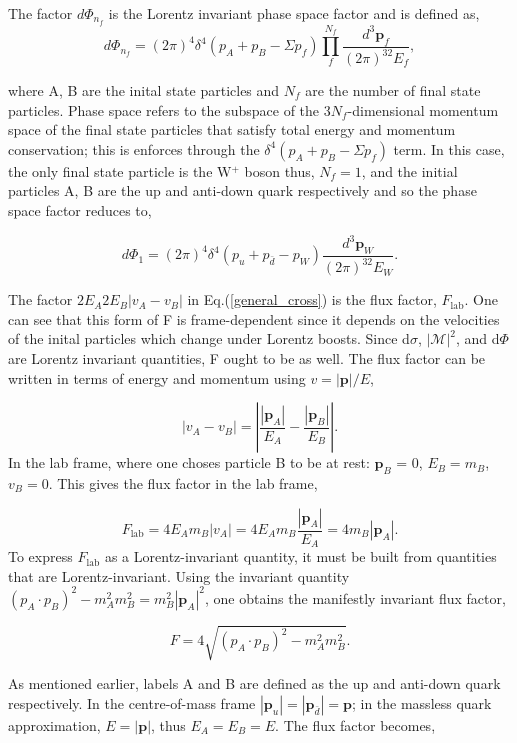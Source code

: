 \documentclass[a4paper,11pt]{article}
\begin{document}
The factor $d\Phi_{n_f}$ is the Lorentz invariant phase space factor and is defined as,
$$d\Phi_{n_f} = (2\pi)^4 \delta^4(p_A +p_B - \Sigma p_f) \prod_{f}^{N_f}\frac{d^3\boldsymbol{p}_f}{(2\pi)^32E_f},$$

where A, B are the inital state particles and $N_f$ are the number of final state particles. Phase space refers to the subspace of the $3N_f$-dimensional momentum space of the final state particles that satisfy total energy and momentum conservation; this is enforces through the $\delta^4(p_A +p_B - \Sigma p_f)$ term. In this case, the only final state particle is the W$^+$ boson thus, $N_f =1$, and the initial particles A, B are the up and anti-down quark respectively and so the phase space factor reduces to,

\begin{equation}\label{LIPS}
	d\Phi_{1} = (2\pi)^4 \delta^4(p_u +p_{\bar{d}} - p_W) \frac{d^3\boldsymbol{p}_W}{(2\pi)^32E_W}.	
\end{equation}


The factor $2E_A 2E_B |v_A - v_B|$ in Eq.(\ref{general_cross}) is the flux factor, $F_{\text{lab}}$. One can see that this form of F is frame-dependent since it depends on the velocities of the inital particles which change under Lorentz boosts. Since d$\sigma$,  $|\mathcal{M}|^2$, and d$\Phi$ are Lorentz invariant quantities, F ought to be as well. The flux factor can be written in terms of energy and momentum using $v = |\boldsymbol{p}|/E$,

$$|v_A-v_B| = \left|\frac{|\boldsymbol{p}_A|}{E_A} - \frac{|\boldsymbol{p}_B|}{E_B}\right|.$$
In the lab frame, where one choses particle B to be at rest: $\boldsymbol{p}_B$ = 0, $E_B = m_B$, $v_B=0$. This gives the flux factor in the lab frame, 

$$ F_{\text{lab}} = 4E_Am_B|v_A| = 4E_Am_B\frac{|\boldsymbol{p}_A|}{E_A} =  4m_B|\boldsymbol{p}_A|.$$
To express $F_{\text{lab}}$ as a Lorentz-invariant quantity, it must be built from quantities that are Lorentz-invariant. Using the invariant quantity $(p_A \cdot p_B)^2 - m_A^2m_B^2 = m_B^2|\boldsymbol{p}_A|^2$, one obtains the manifestly invariant flux factor,

$$F = 4\sqrt{(p_A \cdot p_B)^2 - m_A^2m_B^2 }. $$ 

As mentioned earlier, labels A and B are defined as the up and anti-down quark respectively. In the centre-of-mass frame $|\boldsymbol{p}_u|=|\boldsymbol{p}_{\bar{d}}| = \boldsymbol{p}$; in the massless quark approximation, $E = |\boldsymbol{p}|$, thus $E_A = E_B =E$. The flux factor becomes,
\end{document}
